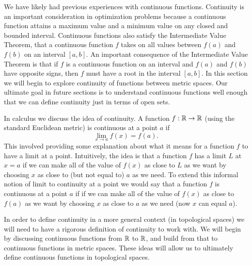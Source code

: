 \label{chap:continuous_functions}


\vspace*{-17 pt}

\vspace*{13 pt}

\label{sec_cont_func_intro}

We have likely had previous experiences with continuous functions. Continuity is an important consideration in optimization problems because a continuous function attains a maximum value and a minimum value on any closed and bounded interval. Continuous functions also satisfy the Intermediate Value Theorem, that a continuous function $f$ takes on all values between $f(a)$ and $f(b)$ on an interval $[a,b]$. An important consequence of the Intermediate Value Theorem is that if $f$ is a continuous function on an interval and $f(a)$ and $f(b)$ have opposite signs, then $f$ must have a root in the interval $[a,b]$. In this section we will begin to explore continuity of functions between metric spaces. Our ultimate goal in future sections is to understand continuous functions well enough that we can define continuity just in terms of open sets. 

In calculus we discuss the idea of continuity. A function $f:\mathbb{R} \to \mathbb{R}$ (using the standard Euclidean metric) is continuous at a point $a$ if 
\[\lim_{x \to a} f(x) = f(a).\]
This involved providing some explanation about what it means for a function $f$ to have a limit at a point. Intuitively, the idea is that a function $f$ has a limit $L$ at $x=a$ if we can make all of the value of $f(x)$ as close to $L$ as we want by choosing $x$ as close to (but not equal to) $a$ as we need. To extend this informal notion of limit to continuity at a point we would say that a function $f$ is continuous at a point $a$ if if we can make all of the value of $f(x)$ as close to $f(a)$ as we want by choosing $x$ as close to $a$ as we need (now $x$ can equal $a$). 

In order to define continuity in a more general context (in topological spaces) we will need to have a rigorous definition of continuity to work with. We will begin by discussing continuous functions from $\mathbb{R}$ to $\mathbb{R}$, and build from that to continuous functions in metric spaces. These ideas will allow us to ultimately define continuous functions in topological spaces. 

